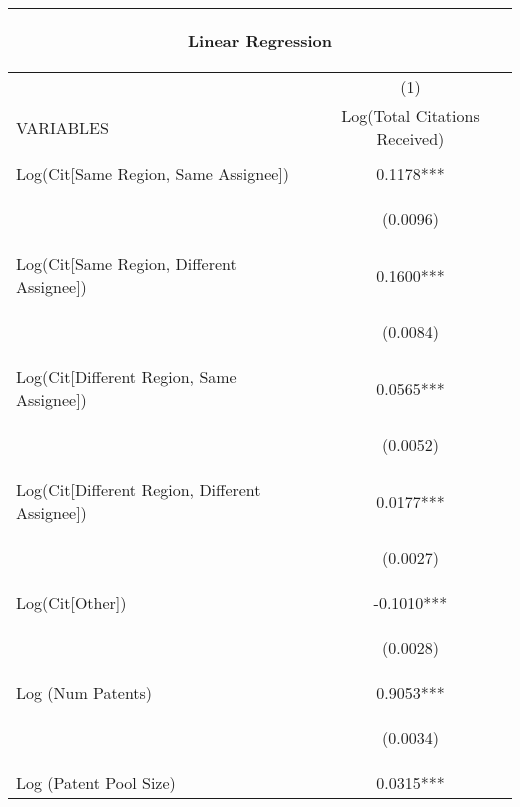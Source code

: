 \begin{center}
\begin{tabular}{lc}
\multicolumn{2}{c}{\begin{large}Linear Regression\label{reg01}\end{large}} \\ \hline
 & (1) \\
VARIABLES & Log(Total Citations Received) \\ \hline
\vspace{4pt} & \begin{footnotesize}\end{footnotesize} \\
Log(Cit[Same Region, Same Assignee]) & 0.1178*** \\
\vspace{4pt} & \begin{footnotesize}(0.0096)\end{footnotesize} \\
Log(Cit[Same Region, Different Assignee]) & 0.1600*** \\
\vspace{4pt} & \begin{footnotesize}(0.0084)\end{footnotesize} \\
Log(Cit[Different Region, Same Assignee]) & 0.0565*** \\
\vspace{4pt} & \begin{footnotesize}(0.0052)\end{footnotesize} \\
Log(Cit[Different Region, Different Assignee]) & 0.0177*** \\
\vspace{4pt} & \begin{footnotesize}(0.0027)\end{footnotesize} \\
Log(Cit[Other]) & -0.1010*** \\
\vspace{4pt} & \begin{footnotesize}(0.0028)\end{footnotesize} \\
Log (Num Patents) & 0.9053*** \\
\vspace{4pt} & \begin{footnotesize}(0.0034)\end{footnotesize} \\
Log (Patent Pool Size) & 0.0315*** \\

\end{tabular}
\end{center}
